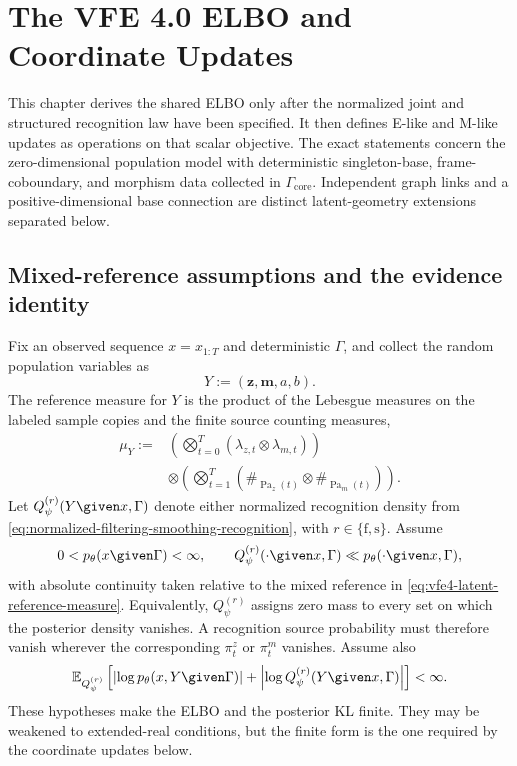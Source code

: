 \chapter[The VFE 4.0 ELBO and Coordinate Updates]{The VFE 4.0 ELBO and\\Coordinate Updates}

This chapter derives the shared ELBO only after the normalized joint and structured recognition law have been specified. It then defines E-like and M-like updates as operations on that scalar objective. The exact statements concern the zero-dimensional population model with deterministic singleton-base, frame-coboundary, and morphism data collected in $\Gamma_{\mathrm{core}}$. Independent graph links and a positive-dimensional base connection are distinct latent-geometry extensions separated below.

\section{Mixed-reference assumptions and the evidence identity}

Fix an observed sequence $x=x_{1:T}$ and deterministic $\Gamma$, and collect the random population variables as
\begin{equation}
Y:=(\boldsymbol z,\boldsymbol m,a,b).
\label{eq:vfe4-latent-inventory}
\end{equation}
The reference measure for $Y$ is the product of the Lebesgue measures on the labeled sample copies and the finite source counting measures,
\begin{equation}
\begin{aligned}
\mu_Y
:={}&\left(\bigotimes_{t=0}^{T}
(\lambda_{z,t}\otimes\lambda_{m,t})\right)\\
&\otimes\left(\bigotimes_{t=1}^{T}
(\#_{\operatorname{Pa}_z(t)}\otimes
\#_{\operatorname{Pa}_m(t)})\right).
\end{aligned}
\label{eq:vfe4-latent-reference-measure}
\end{equation}
Let $Q_\psi^{(r)}(Y\given x,\Gamma)$ denote either normalized recognition density from \cref{eq:normalized-filtering-smoothing-recognition}, with $r\in\{\mathrm f,\mathrm s\}$. Assume
\begin{equation}
0<p_\theta(x\given\Gamma)<\infty,
\qquad
Q_\psi^{(r)}(\mathord{\cdot}\given x,\Gamma)
\ll p_\theta(\mathord{\cdot}\given x,\Gamma),
\label{eq:elbo-posterior-absolute-continuity}
\end{equation}
with absolute continuity taken relative to the mixed reference in \cref{eq:vfe4-latent-reference-measure}. Equivalently, $Q_\psi^{(r)}$ assigns zero mass to every set on which the posterior density vanishes. A recognition source probability must therefore vanish wherever the corresponding $\pi_t^z$ or $\pi_t^m$ vanishes. Assume also
\begin{equation}
\mathbb E_{Q_\psi^{(r)}}\left[
\left|\log p_\theta(x,Y\given\Gamma)\right|
+\left|\log Q_\psi^{(r)}(Y\given x,\Gamma)\right|
\right]<\infty.
\label{eq:elbo-log-integrability}
\end{equation}
These hypotheses make the ELBO and the posterior KL finite. They may be weakened to extended-real conditions, but the finite form is the one required by the coordinate updates below.

